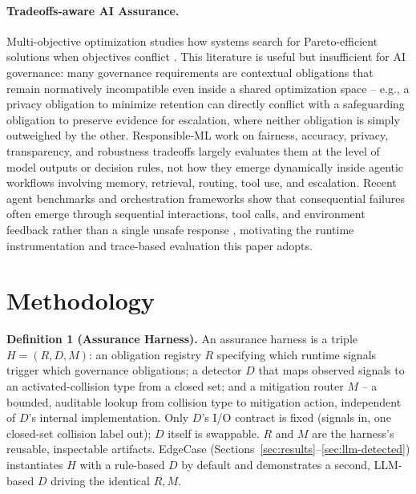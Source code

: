 \documentclass[letterpaper]{article} %
\begin{document}
\paragraph{Tradeoffs-aware AI Assurance.} Multi-objective optimization studies how systems search for Pareto-efficient solutions when objectives conflict \citep{deb2001multiobjective,miettinen1999nonlinear}. This literature is useful but insufficient for AI governance: many governance requirements are contextual obligations that remain normatively incompatible even inside a shared optimization space -- e.g., a privacy obligation to minimize retention can directly conflict with a safeguarding obligation to preserve evidence for escalation, where neither obligation is simply outweighed by the other. Responsible-ML work on fairness, accuracy, privacy, transparency, and robustness tradeoffs \citep{barocas2016disparate,selbst2019fairness,dwork2014algorithmic,jayaraman2022revisiting} largely evaluates them at the level of model outputs or decision rules, not how they emerge dynamically inside agentic workflows involving memory, retrieval, routing, tool use, and escalation. Recent agent benchmarks and orchestration frameworks show that consequential failures often emerge through sequential interactions, tool calls, and environment feedback rather than a single unsafe response \citep{wu2024autogen,yao2024taubench,yang2024sweagent,andriushchenko2024agentharm,zhang2024agentsafetybench}, motivating the runtime instrumentation and trace-based evaluation this paper adopts.

\section{Methodology}
\label{sec:methodology}
\begin{harnessbox}
\textbf{Definition 1 (Assurance Harness).} An assurance harness is a triple $H = (R, D, M)$: an obligation registry $R$ specifying which runtime signals trigger which governance obligations; a detector $D$ that maps observed signals to an activated-collision type from a closed set; and a mitigation router $M$ -- a bounded, auditable lookup from collision type to mitigation action, independent of $D$'s internal implementation. Only $D$'s I/O contract is fixed (signals in, one closed-set collision label out); $D$ itself is swappable. $R$ and $M$ are the harness's reusable, inspectable artifacts. EdgeCase (Sections~\ref{sec:results}--\ref{sec:llm-detected}) instantiates $H$ with a rule-based $D$ by default and demonstrates a second, LLM-based $D$ driving the identical $R, M$.
\end{harnessbox}
\end{document}
